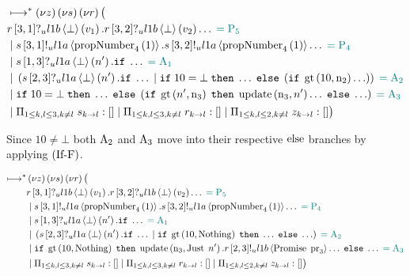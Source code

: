 \begin{align*}
&\mapstostar
\NuChannels \big (\\
&\ReceiveUnreliableP{\ChannelR}{3}{1}{\LOneB}{\bot}{v_1}.\ReceiveUnreliableP{\ChannelR}{3}{2}{\LOneB}{\bot}{v_2}\ldots \comment{= \Proposer{5}}\\
&\Or  \SendUnreliableP{\ChannelS}{3}{1}{\LOneA}{\proposalNumber{1}{4}}.\SendUnreliableP{\ChannelS}{3}{2}{\LOneA}{\proposalNumber{1}{4}}\ldots \comment{= \Proposer{4}}\\
&\Or  \ReceiveUnreliableP{\ChannelS}{1}{3}{\LOneA}{\bot}{n'}.\mIf \ldots \comment{=\Acceptor{1}}\\
&\Or
    \Paren{
        \ReceiveUnreliableP{\ChannelS}{2}{3}{\LOneA}{\bot}{n'}.\mIf \ldots
        \Or
            \mIf 10 = \bot
            \;\mThen \ldots
            \;\mElse \Paren{
                \mIf \greaterThan{10}{\NumberRegister_2} \ldots
                }
    } \comment{=\Acceptor{2}}\\
&\Or \mIf 10 = \bot
        \;\mThen \ldots
        \;\mElse \Paren{
            \mIf \greaterThan{n'}{\NumberRegister_3}
            \;\mThen \update{\NumberRegister_3}{n'}\ldots
            \;\mElse \ldots
        } \comment{=\Acceptor{3}}\\
&\Or \InnerSessionQueues{\ChannelS}
\Or \InnerSessionQueues{\ChannelR}
\Or \OuterSessionQueues
\big )
\end{align*}

Since $10 \neq \bot$ both $\Acceptor{2}$ and $\Acceptor{3}$ move into their respective $\Else$ branches by applying $\RIfF$.

\begin{align*}
\mapstostar& \NuChannels \big (\\
&\ReceiveUnreliableP{\ChannelR}{3}{1}{\LOneB}{\bot}{v_1}.\ReceiveUnreliableP{\ChannelR}{3}{2}{\LOneB}{\bot}{v_2}\ldots \comment{= \Proposer{5}}\\
&\Or \SendUnreliableP{\ChannelS}{3}{1}{\LOneA}{\proposalNumber{1}{4}}.\SendUnreliableP{\ChannelS}{3}{2}{\LOneA}{\proposalNumber{1}{4}}\ldots \comment{= \Proposer{4}}\\
&\Or \ReceiveUnreliableP{\ChannelS}{1}{3}{\LOneA}{\bot}{n'}.\mIf \ldots \comment{=\Acceptor{1}}\\
&\Or \Paren{
    \ReceiveUnreliableP{\ChannelS}{2}{3}{\LOneA}{\bot}{n'}.\mIf \ldots
    \Or
    \mIf \greaterThan{10}{\Nothing}
    \;\mThen \ldots
    \;\mElse \ldots
} \comment{=\Acceptor{2}}\\
&\Or
    \mIf \greaterThan{10}{\Nothing}
    \;\mThen
        \update{\NumberRegister_3}{\Just{n'}}.
        \SendUnreliableP{\ChannelR}{2}{3}{\LOneB}{\Promise{\ProposalRegister_3}}\ldots
    \;\mElse \ldots
    \comment{=\Acceptor{3}}\\
&\Or \InnerSessionQueues{\ChannelS}
\Or \InnerSessionQueues{\ChannelR}
\Or \OuterSessionQueues
\big )
\end{align*}

